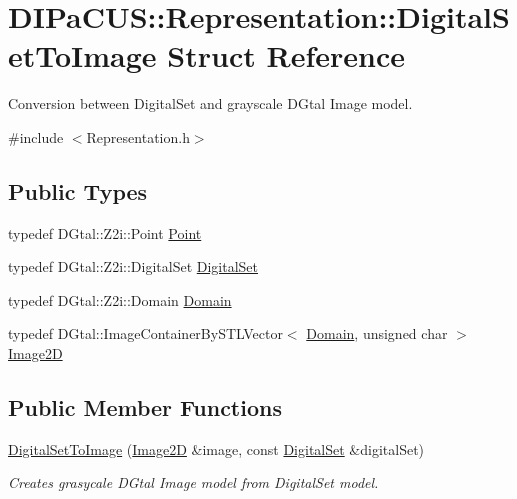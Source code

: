\hypertarget{structDIPaCUS_1_1Representation_1_1DigitalSetToImage}{}\section{D\+I\+Pa\+C\+US\+:\+:Representation\+:\+:Digital\+Set\+To\+Image Struct Reference}
\label{structDIPaCUS_1_1Representation_1_1DigitalSetToImage}


Conversion between Digital\+Set and grayscale D\+Gtal Image model.  




{\ttfamily \#include $<$Representation.\+h$>$}

\subsection*{Public Types}
\begin{DoxyCompactItemize}
\item 
typedef D\+Gtal\+::\+Z2i\+::\+Point \mbox{\hyperlink{structDIPaCUS_1_1Representation_1_1DigitalSetToImage_a6128578cdd135e0c1e62c47bebc18291}{Point}}
\item 
typedef D\+Gtal\+::\+Z2i\+::\+Digital\+Set \mbox{\hyperlink{structDIPaCUS_1_1Representation_1_1DigitalSetToImage_af4d7e5b03eed41ad715ea9e7f1bdeef4}{Digital\+Set}}
\item 
typedef D\+Gtal\+::\+Z2i\+::\+Domain \mbox{\hyperlink{structDIPaCUS_1_1Representation_1_1DigitalSetToImage_af072710c951f50270b684029379c4e0d}{Domain}}
\item 
typedef D\+Gtal\+::\+Image\+Container\+By\+S\+T\+L\+Vector$<$ \mbox{\hyperlink{structDIPaCUS_1_1Representation_1_1DigitalSetToImage_af072710c951f50270b684029379c4e0d}{Domain}}, unsigned char $>$ \mbox{\hyperlink{structDIPaCUS_1_1Representation_1_1DigitalSetToImage_a667d591846f9f83f57380ad2f9f179b0}{Image2D}}
\end{DoxyCompactItemize}
\subsection*{Public Member Functions}
\begin{DoxyCompactItemize}
\item 
\mbox{\hyperlink{structDIPaCUS_1_1Representation_1_1DigitalSetToImage_ab21120e41d9076e0570e45435d2dae41}{Digital\+Set\+To\+Image}} (\mbox{\hyperlink{structDIPaCUS_1_1Representation_1_1DigitalSetToImage_a667d591846f9f83f57380ad2f9f179b0}{Image2D}} \&image, const \mbox{\hyperlink{structDIPaCUS_1_1Representation_1_1DigitalSetToImage_af4d7e5b03eed41ad715ea9e7f1bdeef4}{Digital\+Set}} \&digital\+Set)
\begin{DoxyCompactList}\small\item\em Creates grasycale D\+Gtal Image model from Digital\+Set model. \end{DoxyCompactList}\end{DoxyCompactItemize}



